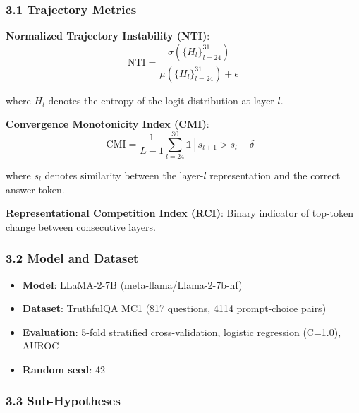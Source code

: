 
\subsubsection{3.1 Trajectory Metrics}

\textbf{Normalized Trajectory Instability (NTI)}:
$$\text{NTI} = \frac{\sigma(\{H_l\}_{l=24}^{31})}{\mu(\{H_l\}_{l=24}^{31}) + \epsilon}$$

where $H_l$ denotes the entropy of the logit distribution at layer $l$.

\textbf{Convergence Monotonicity Index (CMI)}:
$$\text{CMI} = \frac{1}{L-1} \sum_{l=24}^{30} \mathbb{1}[s_{l+1} > s_l - \delta]$$

where $s_l$ denotes similarity between the layer-$l$ representation and the correct answer token.

\textbf{Representational Competition Index (RCI)}: Binary indicator of top-token change between consecutive layers.

\subsubsection{3.2 Model and Dataset}

\begin{itemize}
\item \textbf{Model}: LLaMA-2-7B (meta-llama/Llama-2-7b-hf)
\item \textbf{Dataset}: TruthfulQA MC1 (817 questions, 4114 prompt-choice pairs)
\item \textbf{Evaluation}: 5-fold stratified cross-validation, logistic regression (C=1.0), AUROC
\item \textbf{Random seed}: 42
\end{itemize}

\subsubsection{3.3 Sub-Hypotheses}

\begin{table}[htbp]
\centering
{}
\end{table}

